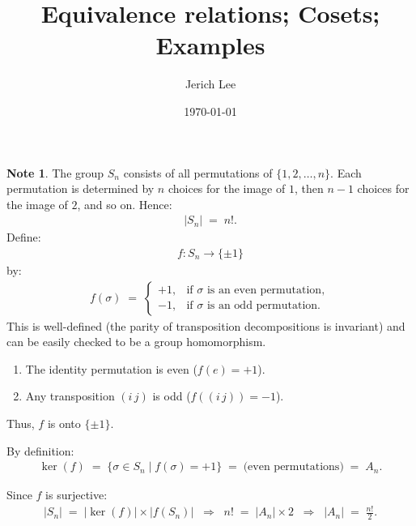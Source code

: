 \documentclass[12pt]{article}
\title{Equivalence relations; Cosets; Examples}
\author{Jerich Lee}
\date{\today}
\theoremstyle{definition} %
\newtheorem{note}{Note}
\theoremstyle{plain} %
\begin{document}
\maketitle
\begin{note}
    The group $ S_n $ consists of all permutations of $ \{1, 2, \dots, n\} $. Each permutation is determined by $ n $ choices for the image of $ 1 $, then $ n-1 $ choices for the image of $ 2 $, and so on. Hence:
    \begin{align}
        |S_n| \;=\; n!.
    \end{align}
    Define:
    \begin{align}
        f \colon S_n \to \{\pm1\}
    \end{align}
    by:
    \begin{align}
        f(\sigma) \;=\; 
        \begin{cases}
            +1, & \text{if $\sigma$ is an even permutation}, \\
            -1, & \text{if $\sigma$ is an odd permutation}.
        \end{cases}
    \end{align}
    This is well-defined (the parity of transposition decompositions is invariant) and can be easily checked to be a group homomorphism.
    \begin{enumerate}
        \item The identity permutation is even ($f(e) = +1$).
        \item Any transposition $(i\, j)$ is odd ($f((i\, j)) = -1$).
    \end{enumerate}
    Thus, $f$ is onto $\{\pm1\}$.

    By definition:
    \begin{align}
        \ker(f) \;=\; \{\sigma \in S_n \mid f(\sigma) = +1\} 
        \;=\; \text{(even permutations)} 
        \;=\; A_n.
    \end{align}

    Since $f$ is surjective:
    \begin{align}
        |S_n| \;=\; |\ker(f)| \times |f(S_n)|
        \;\;\Longrightarrow\;\;
        n! \;=\; |A_n| \times 2 
        \;\;\Longrightarrow\;\;
        |A_n| \;=\; \frac{n!}{2}.
    \end{align} 
\end{note}
\end{document}
